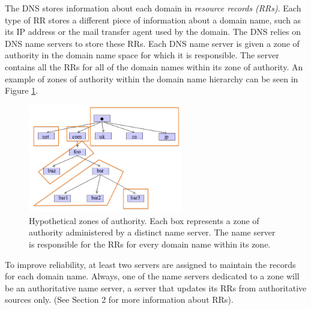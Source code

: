 \documentclass[11pt,a4paper]{article}
\begin{document}
The DNS stores information about each domain in \textit{resource records (RRs)}. 
Each type of RR stores a different piece of information about a domain name, such as its IP address or the mail transfer agent used by the domain. 
The DNS relies on DNS name servers to store these RRs.
Each DNS name server is given a zone of authority in the domain name space for which it is responsible. 
The server contains all the RRs for all of the domain names within its zone of authority. 
An example of zones of authority within the domain name hierarchy can be seen in Figure \ref{fig:zone}.

\begin{figure}[H]
	
    \centering
    	\includegraphics[width=0.6\textwidth]{KkU6GWrzYGTS7GpSURtX7Dh9tFX_BjWGijM_HnewKXw.png}
    \caption{Hypothetical zones of authority. Each box represents a zone of authority administered by a distinct name server. The name server is responsible for the RRs for every domain name within its zone. }
    \label{fig:zone}
\end{figure}

To improve reliability, at least two servers are assigned to maintain the
records for each domain name.  Always, one of the name servers dedicated to a
zone will be an authoritative name server, a server that updates its RRs from
authoritative sources only. (See Section 2 for more information about RRs).
\end{document}
